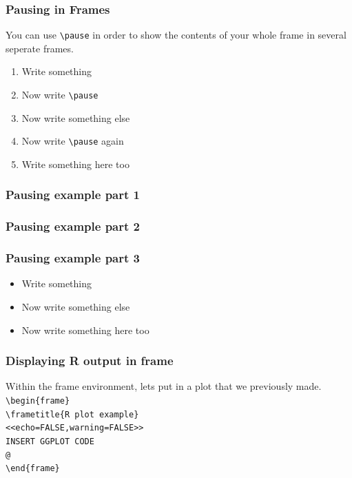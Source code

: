 \documentclass[nogin]{beamer}\usepackage[]{graphicx}\usepackage[]{color}
\begin{document}
\begin{frame}[fragile]
\frametitle{Pausing in Frames}
You can use \verb|\pause| in order to show the contents of your whole frame in several seperate frames.
\begin{enumerate}
\item Write something
\item Now write \verb|\pause|
\item Now write something else
\item Now write \verb|\pause| again
\item Write something here too
\end{enumerate}
\end{frame}

\begin{frame}
\frametitle<1>{Pausing example part 1}
\frametitle<2>{Pausing example part 2}
\frametitle<3>{Pausing example part 3}
\begin{itemize}
\item Write something
\pause
\item Now write something else
\pause
\item Now write something here too
\end{itemize}
\end{frame}

\begin{frame}[fragile]
\frametitle{Displaying R output in frame}
Within the frame environment, lets put in a plot that we previously made.\\
\verb|\begin{frame}|\\
\verb|\frametitle{R plot example}|\\
\verb|<<echo=FALSE,warning=FALSE>>|\\
\verb|INSERT GGPLOT CODE|\\
\verb|@|\\
\verb|\end{frame}|
\end{frame}
\end{document}
